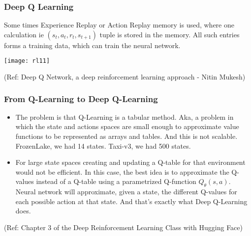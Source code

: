 \begin{frame}[fragile]\frametitle{Deep Q Learning}

Some times Experience Replay or Action Replay memory is used, where one calculation ie $(s_t,a_t,r_t,s_{t+1})$ tuple is stored in the memory. All such entries forms a training data, which can train the neural network.

\begin{center}
\texttt{[image: rl11]}
\end{center}

{\tiny (Ref: Deep Q Network, a deep reinforcement learning approach - Nitin Mukesh)}
\end{frame}


\begin{frame}[fragile]\frametitle{From Q-Learning to Deep Q-Learning}

\begin{itemize}
\item The problem is that Q-Learning is a tabular method. Aka, a problem in which the state and actions spaces are small enough to approximate value functions to be represented as arrays and tables. And this is not scalable. FrozenLake, we had 14 states. Taxi-v3, we had 500 states.
\item For large state spaces creating and updating a Q-table for that environment would not be efficient. In this case, the best idea is to approximate the Q-values instead of a Q-table using a parametrized Q-function $Q_{\theta}(s,a)$. Neural network will approximate, given a state, the different Q-values for each possible action at that state. And that's exactly what Deep Q-Learning does.
\end{itemize}


{\tiny (Ref: Chapter 3 of the Deep Reinforcement Learning Class with Hugging Face)}

\end{frame}


